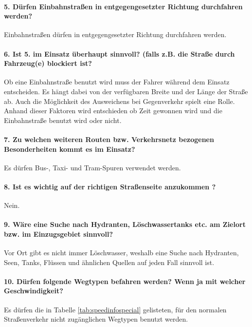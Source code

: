 \paragraph*{5. Dürfen Einbahnstraßen in entgegengesetzter Richtung durchfahren werden?}
\label{frage5}
\par
Einbahnstraßen dürfen in entgegengesetzter Richtung durchfahren werden.

\paragraph*{6. Ist 5. im Einsatz überhaupt sinnvoll? (falls z.B. die Straße durch Fahrzeug(e) blockiert ist?}
\label{frage6}
\par
Ob eine Einbahnstraße benutzt wird muss der Fahrer während dem Einsatz entscheiden.
Es hängt dabei von der verfügbaren Breite und der Länge der Straße ab.
Auch die Möglichkeit des Ausweichens bei Gegenverkehr spielt eine Rolle.
Anhand dieser Faktoren wird entschieden ob Zeit gewonnen wird und die Einbahnstraße benutzt wird oder nicht.

\paragraph*{7. Zu welchen weiteren Routen bzw. Verkehrsnetz bezogenen Besonderheiten kommt es im Einsatz?}
\label{frage7}
\par
Es dürfen Bus-, Taxi- und Tram-Spuren verwendet werden.

\paragraph*{8. Ist es wichtig auf der richtigen Straßenseite anzukommen ?}
\par
Nein.

\paragraph*{9. Wäre eine Suche nach Hydranten, Löschwassertanks etc. am Zielort bzw. im Einzugsgebiet sinnvoll?}
\label{frage9}
\par
Vor Ort gibt es nicht immer Löschwasser, weshalb eine Suche nach Hydranten, Seen, Tanks, Flüssen und ähnlichen Quellen auf jeden Fall sinnvoll ist.

\paragraph*{10. Dürfen folgende Wegtypen befahren werden? Wenn ja mit welcher Geschwindigkeit?}
\label{frage10}
\par
Es dürfen die in Tabelle \ref{tab:speedinfospecial} gelisteten, für den normalen Straßenverkehr nicht zugänglichen Wegtypen benutzt werden.

